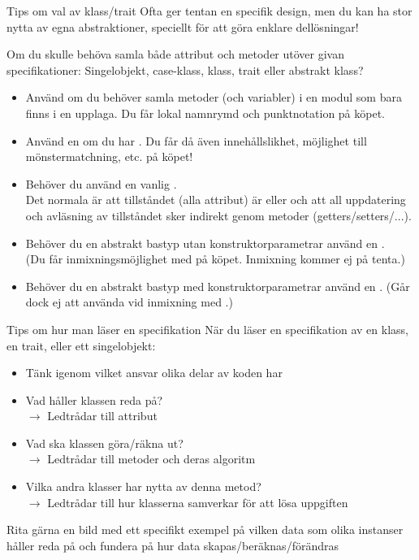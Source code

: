 

\begin{Slide}{Tips om val av klass/trait}\SlideFontSmall
Ofta ger tentan en specifik design, men du kan ha stor nytta av egna abstraktioner, speciellt  för att göra enklare dellösningar!

\pause\vspace{1em}Om du skulle behöva samla både attribut och metoder utöver givan specifikationer:
Singelobjekt, case-klass, klass, trait eller abstrakt klass?
\begin{itemize}\SlideFontTiny
\item Använd  om du behöver samla metoder (och variabler) i en modul som bara finns i en upplaga. Du får lokal namnrymd och punktnotation på köpet.
\item Använd en  om du har . Du får då även innehållslikhet, möjlighet till mönstermatchning, etc. på köpet! 
\item Behöver du  använd en vanlig .\\ Det normala är att tillståndet (alla attribut) är  eller  och att all uppdatering och avläsning av tillståndet sker indirekt genom metoder (getters/setters/...). 
\item Behöver du en abstrakt bastyp utan konstruktorparametrar använd en . \\(Du får inmixningsmöjlighet med  på köpet. Inmixning kommer ej på tenta.)
\item Behöver du en abstrakt bastyp med konstruktorparametrar använd en . (Går dock ej att använda vid inmixning med .)
\end{itemize}
\end{Slide}


\begin{Slide}{Tips om hur man läser en specifikation}\SlideFontSmall
När du läser en specifikation av en klass, en trait, eller ett singelobjekt:
\begin{itemize}
\item Tänk igenom vilket ansvar olika delar av koden har
\item Vad håller klassen reda på? \\$\rightarrow$ Ledtrådar till attribut
\item Vad ska klassen göra/räkna ut? \\$\rightarrow$ Ledtrådar till metoder och deras algoritm
\item Vilka andra klasser har nytta av denna metod? \\$\rightarrow$ Ledtrådar till hur klasserna samverkar för att lösa uppgiften
\end{itemize}
Rita gärna en bild med ett specifikt exempel på vilken data som olika instanser håller reda på och fundera på hur data skapas/beräknas/förändras
\end{Slide}


